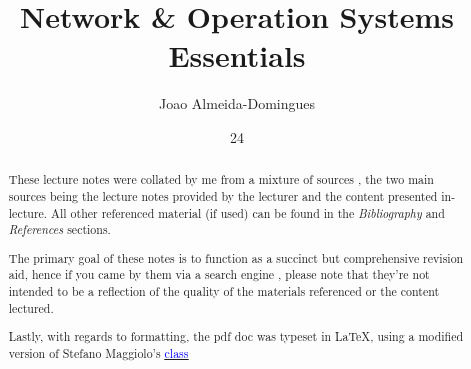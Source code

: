 \documentclass[english,course]{Notes}
\title{Network \& Operation Systems Essentials}
\author{Joao Almeida-Domingues}
\date{24}{09}{2018}
\newcommand{\ita}[1]{\textit{#1}}
\begin{document}
\begin{abstract}
\par{These lecture notes were collated by me from a mixture of sources , the two main sources being the lecture notes provided by the lecturer and the content presented in-lecture. All other referenced material (if used) can be found in the \ita{Bibliography} and \ita{References} sections.}
\par{The primary goal of these notes is to function as a succinct but comprehensive revision aid, hence if you came by them via a search engine , please note that they're not intended to be a reflection of the quality of the materials referenced or the content lectured.}
\par{Lastly, with regards to formatting, the pdf doc was typeset in \LaTeX , using a modified version of Stefano Maggiolo's \href{http://blog.poormansmath.net/latex-class-for-lecture-notes/}{\underline{\textcolor{blue}{class}}}}
\end{abstract}
\newpage


\newpage
\nocite{*}
\printbibliography
\end{document}
